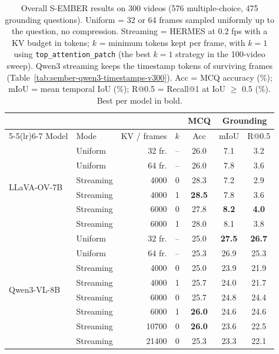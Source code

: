
\begin{table}[t]
\centering
\small
\caption{Overall S-EMBER results on 300 videos (576 multiple-choice, 475 grounding questions). Uniform = 32 or 64 frames sampled uniformly up to the question, no compression. Streaming = HERMES at 0.2 fps with a KV budget in tokens; $k$ = minimum tokens kept per frame, with $k{=}1$ using \texttt{top\_attention\_patch} (the best $k{=}1$ strategy in the 100-video sweep). Qwen3 streaming keeps the timestamp tokens of surviving frames (Table~\ref{tab:sember-qwen3-timestamps-v300}). Acc = MCQ accuracy (\%); mIoU = mean temporal IoU (\%); R@0.5 = Recall@1 at IoU $\geq$ 0.5 (\%). Best per model in bold.}
\label{tab:sember-overall-v300}
\begin{tabular}{llrcccc}
\toprule
& & & & MCQ & \multicolumn{2}{c}{Grounding} \\
\cmidrule(lr){5-5}\cmidrule(lr){6-7}
Model & Mode & KV / frames & $k$ & Acc & mIoU & R@0.5 \\
\midrule
\multirow{6}{*}{LLaVA-OV-7B} & Uniform & 32 fr. & -- & 26.0 & 7.1 & 3.2 \\
 & Uniform & 64 fr. & -- & 26.0 & 7.8 & 3.6 \\
\cmidrule(lr){2-7}
 & Streaming & 4000 & 0 & 28.3 & 7.2 & 2.9 \\
 & Streaming & 4000 & 1 & \textbf{28.5} & 7.8 & 3.6 \\
 & Streaming & 6000 & 0 & 27.8 & \textbf{8.2} & \textbf{4.0} \\
 & Streaming & 6000 & 1 & 28.0 & 8.1 & 3.8 \\
\midrule
\multirow{8}{*}{Qwen3-VL-8B} & Uniform & 32 fr. & -- & 25.0 & \textbf{27.5} & \textbf{26.7} \\
 & Uniform & 64 fr. & -- & 25.3 & 26.9 & 25.3 \\
\cmidrule(lr){2-7}
 & Streaming & 4000 & 0 & 25.0 & 23.9 & 21.9 \\
 & Streaming & 4000 & 1 & 25.7 & 24.0 & 21.7 \\
 & Streaming & 6000 & 0 & 25.7 & 24.8 & 24.4 \\
 & Streaming & 6000 & 1 & \textbf{26.0} & 24.6 & 24.6 \\
 & Streaming & 10700 & 0 & \textbf{26.0} & 23.6 & 22.5 \\
 & Streaming & 21400 & 0 & 25.3 & 23.3 & 22.1 \\
\bottomrule
\end{tabular}
\end{table}

